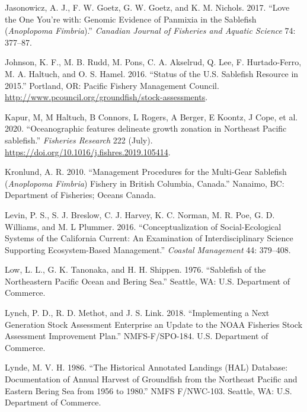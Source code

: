\documentclass[11pt,
  english,
  a4paper,
]{article}
\newlength{\cslhangindent}
\newenvironment{cslreferences}%
  {\setlength{\parindent}{0pt}%
  \everypar{\setlength{\hangindent}{\cslhangindent}}\ignorespaces}%
  {\par}
\begin{document}
\begin{cslreferences}
\leavevmode\hypertarget{ref-jasonowicz2017cjfaslove}{}%
Jasonowicz, A. J., F. W. Goetz, G. W. Goetz, and K. M. Nichols. 2017. ``Love the One You're with: Genomic Evidence of Panmixia in the Sablefish (\emph{Anoplopoma Fimbria}).'' \emph{Canadian Journal of Fisheries and Aquatic Science} 74: 377--87.

\leavevmode\hypertarget{ref-johnson2016sablefish}{}%
Johnson, K. F., M. B. Rudd, M. Pons, C. A. Akselrud, Q. Lee, F. Hurtado-Ferro, M. A. Haltuch, and O. S. Hamel. 2016. ``Status of the U.S. Sablefish Resource in 2015.'' Portland, OR: Pacific Fishery Management Council. \url{http://www.pcouncil.org/groundfish/stock-assessments}.

\leavevmode\hypertarget{ref-kapur2020}{}%
Kapur, M, M Haltuch, B Connors, L Rogers, A Berger, E Koontz, J Cope, et al. 2020. ``Oceanographic features delineate growth zonation in Northeast Pacific sablefish.'' \emph{Fisheries Research} 222 (July). \url{https://doi.org/10.1016/j.fishres.2019.105414}.

\leavevmode\hypertarget{ref-kronlund2010}{}%
Kronlund, A. R. 2010. ``Management Procedures for the Multi-Gear Sablefish (\emph{\textup{Anoplopoma Fimbria}}) Fishery in British Columbia, Canada.'' Nanaimo, BC: Department of Fisheries; Oceans Canada.

\leavevmode\hypertarget{ref-levin2016}{}%
Levin, P. S., S. J. Breslow, C. J. Harvey, K. C. Norman, M. R. Poe, G. D. Williams, and M. L Plummer. 2016. ``Conceptualization of Social-Ecological Systems of the California Current: An Examination of Interdisciplinary Science Supporting Ecosystem-Based Management.'' \emph{Coastal Management} 44: 379--408.

\leavevmode\hypertarget{ref-low1976}{}%
Low, L. L., G. K. Tanonaka, and H. H. Shippen. 1976. ``Sablefish of the Northeastern Pacific Ocean and Bering Sea.'' Seattle, WA: U.S. Department of Commerce.

\leavevmode\hypertarget{ref-lynch2018}{}%
Lynch, P. D., R. D. Methot, and J. S. Link. 2018. ``Implementing a Next Generation Stock Assessment Enterprise an Update to the NOAA Fisheries Stock Assessment Improvement Plan.'' NMFS-F/SPO-184. U.S. Department of Commerce.

\leavevmode\hypertarget{ref-lynde1986}{}%
Lynde, M. V. H. 1986. ``The Historical Annotated Landings (HAL) Database: Documentation of Annual Harvest of Groundfish from the Northeast Pacific and Eastern Bering Sea from 1956 to 1980.'' NMFS F/NWC-103. Seattle, WA: U.S. Department of Commerce.


\end{cslreferences}
\end{document}
